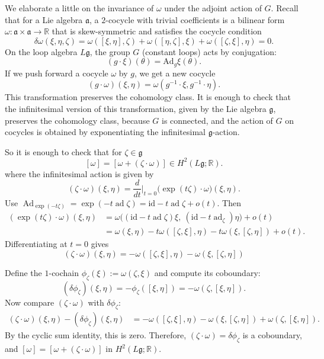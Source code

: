 \documentclass[12pt]{article}
\begin{document}
\begin{remark}
    We elaborate a little on the invariance of $\omega$ under the adjoint action of $G$. Recall that for a Lie algebra $\mathfrak{a}$, a $2$-cocycle with trivial coefficients is a bilinear form $\omega : \mathfrak{a}\times\mathfrak{a}\to \mathbb{R}$ that is skew-symmetric and satisfies the cocycle condition
    \[
        \delta\omega(\xi,\eta,\zeta) =
        \omega([\xi,\eta],\zeta) + \omega([\eta,\zeta],\xi) + \omega([\zeta,\xi],\eta) = 0.
    \]
    On the loop algebra $L\mathfrak{g}$, the group $G$ (constant loops) acts by conjugation:
    \[
        (g\cdot \xi)(\theta) = \mathrm{Ad}_g \xi(\theta).
    \]
    If we push forward a cocycle $\omega$ by $g$, we get a new cocycle
    \[
        (g\cdot \omega)(\xi,\eta) = \omega(g^{-1}\cdot \xi,  g^{-1}\cdot \eta).
    \]
This transformation preserves the cohomology class. It is enough to check that the infinitesimal version of this transformation, given by the Lie algebra $\mathfrak{g}$, preserves the cohomology class, because $G$ is connected, and the action of $G$ on cocycles is obtained by exponentiating the infinitesimal $\mathfrak g$-action.


So it is enough to check that for $\zeta\in \mathfrak{g}$
    \[
        [\omega] = [\omega + (\zeta\cdot\omega)] \in H^2(L\mathfrak{g};\mathbb{R}).
    \]
    where the infinitesimal action is given by
    \[
        (\zeta\cdot \omega)(\xi,\eta) = \frac{d}{dt}|_{t=0}\big( \exp(t\zeta)\cdot \omega \big)(\xi,\eta).
    \]
    Use $\operatorname{Ad}_{\exp(-t\zeta)} = \exp(-t\operatorname{ad}\zeta)
        = \mathrm{id}-t\operatorname{ad}\zeta + o(t)$. Then
    \begin{align*}
        (\exp(t\zeta)\cdot \omega)(\xi,\eta)
         & = \omega\Big((\mathrm{id}-t\operatorname{ad}\zeta)\xi,\ (\mathrm{id}-t\operatorname{ad}_\zeta)\eta\Big) + o(t) \\
         & = \omega(\xi,\eta)- t\omega([\zeta,\xi],\eta)- t\omega(\xi,[\zeta,\eta])+o(t).
    \end{align*}
    Differentiating at $t=0$ gives
    \[
        (\zeta \cdot \omega)(\xi,\eta)
        = - \omega([\zeta,\xi],\eta) - \omega(\xi,[\zeta,\eta])
    \]

    Define the $1$-cochain $\phi_\zeta(\xi) := \omega(\zeta, \xi)$ and compute its coboundary:
    \[
        (\delta\phi_\zeta)(\xi, \eta) = -\phi_\zeta([\xi, \eta]) = -\omega(\zeta, [\xi, \eta]).
    \]
    Now compare $(\zeta\cdot\omega)$ with $\delta\phi_\zeta$:
    \begin{align*}
        (\zeta\cdot\omega)(\xi, \eta) - (\delta\phi_\zeta)(\xi, \eta)
         & = -\omega([\zeta, \xi], \eta) - \omega(\xi, [\zeta, \eta]) + \omega(\zeta, [\xi, \eta]).
    \end{align*} By the cyclic sum identity, this is zero.
    Therefore, $(\zeta\cdot\omega) = \delta\phi_\zeta$
    is a coboundary, and $[\omega] = [\omega + (\zeta\cdot\omega)]$ in $H^2(L\mathfrak{g};\mathbb{R})$.
\end{remark}
\end{document}

